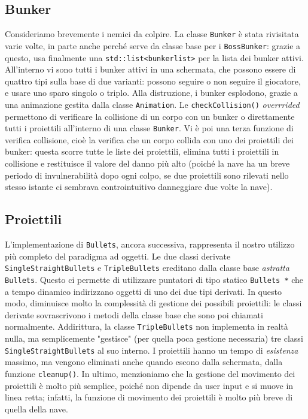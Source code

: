\documentclass{article}
\begin{document}
\subsection{Bunker}
Consideriamo brevemente i nemici da colpire. La classe \lstinline{Bunker} è stata rivisitata varie volte, in parte anche perché serve da classe base per i \lstinline{BossBunker}: grazie a questo, usa finalmente una \lstinline{std::list<bunkerlist>} per la lista dei bunker attivi. All'interno vi sono tutti i bunker attivi in una schermata, che possono essere di quattro tipi sulla base di due varianti: possono seguire o non seguire il giocatore, e usare uno sparo singolo o triplo. Alla distruzione, i bunker esplodono, grazie a una animazione gestita dalla classe \lstinline{Animation}. Le  \lstinline{checkCollision()} \textit{overrrided} permettono di verificare la collisione di un corpo con un bunker o direttamente tutti i proiettili all'interno di una classe \lstinline{Bunker}. Vi è poi una terza funzione di verifica collisione, cioè la verifica che un corpo collida con uno dei proiettili dei bunker: questa scorre tutte le liste dei proiettili, elimina tutti i proiettili in collisione e restituisce il valore del danno più alto (poiché la nave ha un breve periodo di invulnerabilità dopo ogni colpo, se due proiettili sono rilevati nello stesso istante ci sembrava controintuitivo danneggiare due volte la nave).

\subsection{Proiettili}
L'implementazione di \lstinline{Bullets}, ancora successiva, rappresenta il nostro utilizzo più completo del paradigma ad oggetti. Le due classi derivate \lstinline{SingleStraightBullets} e \lstinline{TripleBullets} ereditano dalla classe base \textit{astratta} \lstinline{Bullets}. Questo ci permette di utilizzare puntatori di tipo statico \lstinline{Bullets *} che a tempo dinamico indirizzano oggetti di uno dei due tipi derivati. In questo modo, diminuisce molto la complessità di gestione dei possibili proiettili: le classi derivate sovrascrivono i metodi della classe base che sono poi chiamati normalmente. Addirittura, la classe \lstinline{TripleBullets} non implementa in realtà nulla, ma semplicemente "gestisce" (per quella poca gestione necessaria) tre classi \lstinline{SingleStraightBullets} al suo interno. I proiettili hanno un tempo di \textit{esistenza} massimo, ma vengono eliminati anche quando escono dalla schermata, dalla funzione \lstinline{cleanup()}. In ultimo, menzioniamo che la gestione del movimento dei proiettili è molto più semplice, poiché non dipende da user input e si muove in linea retta; infatti, la funzione di movimento dei proiettili è molto più breve di quella della nave.
\end{document}
